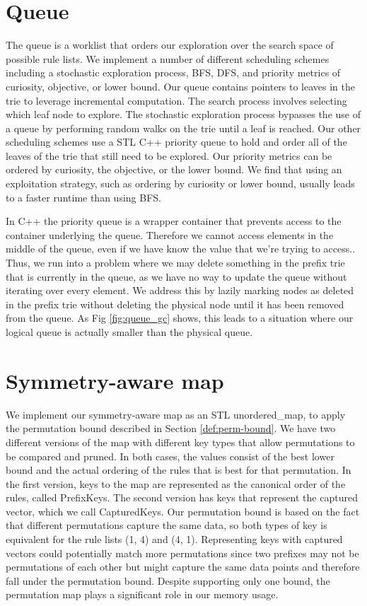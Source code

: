 \section{Queue}\label{sec:queue}
The queue is a worklist that orders our exploration over the search space of possible rule lists.
We implement a number of different scheduling schemes including a stochastic exploration process, BFS, DFS, and priority metrics of curiosity, objective, or lower bound.
Our queue contains pointers to leaves in the trie to leverage incremental computation.
The search process involves selecting which leaf node to explore.
The stochastic exploration process bypasses the use of a queue by performing random walks on the trie until a leaf is reached.
Our other scheduling schemes use a STL C++ priority queue to hold and order all of the leaves of the trie that still need to be explored.
Our priority metrics can be ordered by curiosity, the objective, or the lower bound.
We find that using an exploitation strategy, such as ordering by curiosity or lower bound, usually leads to a faster runtime than using BFS.

In C++ the priority queue is a wrapper container that prevents access to the container underlying the queue.
Therefore we cannot access elements in the middle of the queue, even if we have know the value that we're trying to access..
Thus, we run into a problem where we may delete something in the prefix trie that is currently in the queue, as we have no way to update the queue without iterating over every element.
We address this by lazily marking nodes as deleted in the prefix trie without deleting the physical node until it has been removed from the queue.
As Fig \ref{fig:queue_gc} shows, this leads to a situation where our logical queue is actually smaller than the physical queue.

\section{Symmetry-aware map}
\label{sec:pmap}
We implement our symmetry-aware map as an STL unordered\_map, to apply the permutation bound described in Section \ref{def:perm-bound}.
We have two different versions of the map with different key types that allow permutations to be compared and pruned.
In both cases, the values consist of the best lower bound and the actual ordering of the rules that is best for that permutation.
In the first version, keys to the map are represented as the canonical order of the rules, called PrefixKeys.
The second version has keys that represent the captured vector, which we call CapturedKeys.
Our permutation bound is based on the fact that different permutations capture the same data, so both types of key is equivalent for the rule lists (1, 4) and (4, 1).
Representing keys with captured vectors could potentially match more permutations since two prefixes may not be permutations of each other but might capture the same data points and therefore fall under the permutation bound.
Despite supporting only one bound, the permutation map plays a significant role in our memory usage.

